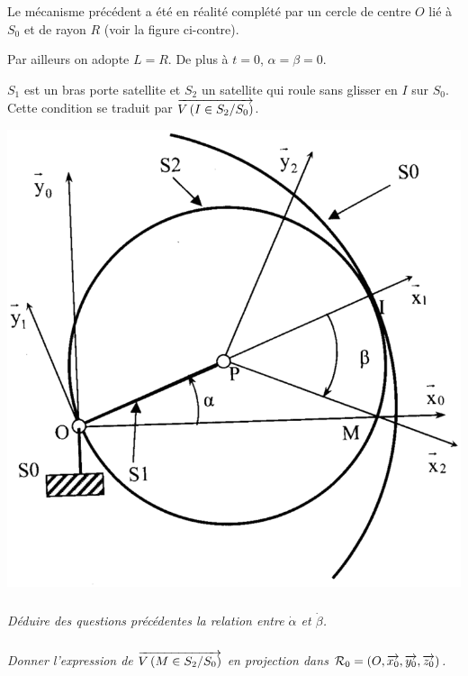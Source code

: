 \documentclass[10pt,oneside]{article}
\begin{document}
\begin{minipage}[c]{.4\linewidth}
Le mécanisme précédent a été en réalité complété par un cercle de centre $O$ lié à $S_0$ et de rayon $R$ (voir la figure ci-contre).

 
Par ailleurs on adopte $L = R$. De plus à $t = 0$,  $\alpha=\beta=0$.

$S_1$ est un bras porte satellite et $S_2$ un satellite qui roule sans glisser en $I$ sur $S_0$. Cette condition se traduit par $\overrightarrow{V\left( {I} \in {S_2}/{S_0}\right)}$.

\end{minipage}\hfill
\begin{minipage}[c]{.55\linewidth}
\begin{center}
\includegraphics[width=.95\textwidth]{png/fig3}
\end{center}
\end{minipage}
 

\subparagraph{}
\textit{Déduire des questions précédentes la relation entre $\dot{\alpha}$ et $\dot{\beta}$.}


\subparagraph{}
\textit{Donner l'expression de $\overrightarrow{V\left( {M} \in {S_2}/{S_0}\right)}$ en projection dans $\mathcal{R}_0 = \left(O,\overrightarrow{x_0},\overrightarrow{y_0},\overrightarrow{z_0}\right)$.}
\end{document}
